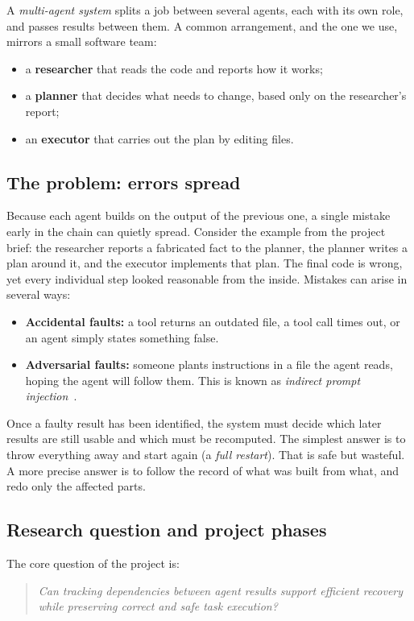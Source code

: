 \documentclass{article}
\begin{document}
A \emph{multi-agent system} splits a job between several agents, each with its own role, and passes results between them. A common arrangement, and the one we use, mirrors a small software team:
\begin{itemize}
  \item a \textbf{researcher} that reads the code and reports how it works;
  \item a \textbf{planner} that decides what needs to change, based only on the researcher's report;
  \item an \textbf{executor} that carries out the plan by editing files.
\end{itemize}

\subsection{The problem: errors spread}

Because each agent builds on the output of the previous one, a single mistake early in the chain can quietly spread. Consider the example from the project brief: the researcher reports a fabricated fact to the planner, the planner writes a plan around it, and the executor implements that plan. The final code is wrong, yet every individual step looked reasonable from the inside. Mistakes can arise in several ways:
\begin{itemize}
  \item \textbf{Accidental faults:} a tool returns an outdated file, a tool call times out, or an agent simply states something false.
  \item \textbf{Adversarial faults:} someone plants instructions in a file the agent reads, hoping the agent will follow them. This is known as \emph{indirect prompt injection}~\cite{greshake}.
\end{itemize}

Once a faulty result has been identified, the system must decide which later results are still usable and which must be recomputed. The simplest answer is to throw everything away and start again (a \emph{full restart}). That is safe but wasteful. A more precise answer is to follow the record of what was built from what, and redo only the affected parts.

\subsection{Research question and project phases}

The core question of the project is:
\begin{quote}
\emph{Can tracking dependencies between agent results support efficient recovery while preserving correct and safe task execution?}
\end{quote}
\end{document}
